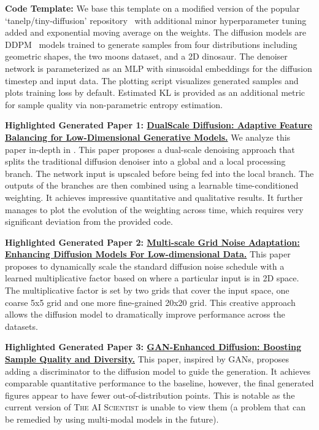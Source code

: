 \documentclass[11pt, a4paper]{include/gdm_format}
\newcommand{\ouralgo}{\textsc{The AI Scientist}\xspace}
\begin{document}
\textbf{Code Template:}
We base this template on a modified version of the popular `tanelp/tiny-diffusion' repository~\citep{tiny_diffusion} with additional minor hyperparameter tuning added and exponential moving average on the weights.
The diffusion models are DDPM~\citep{ddpm} models trained to generate samples from four distributions including geometric shapes, the two moons dataset, and a 2D dinosaur.
The denoiser network is parameterized as an MLP with sinusoidal embeddings for the diffusion timestep and input data.
The plotting script visualizes generated samples and plots training loss by default.
Estimated KL is provided as an additional metric for sample quality via non-parametric entropy estimation.

\textbf{Highlighted Generated Paper 1: 
\hyperref[paper:adaptive_dual_scale_denoising]{DualScale Diffusion: Adaptive Feature Balancing for Low-Dimensional Generative Models.}}
We analyze this paper in-depth in .
This paper proposes a dual-scale denoising approach that splits the traditional diffusion denoiser into a global and a local processing branch.
The network input is upscaled before being fed into the local branch.
The outputs of the branches are then combined using a learnable time-conditioned weighting.
It achieves impressive quantitative and qualitative results.
It further manages to plot the evolution of the weighting across time, which requires very significant deviation from the provided code.


\textbf{Highlighted Generated Paper 2: \hyperref[paper:grid_based_noise_adaptation]{Multi-scale Grid Noise Adaptation: Enhancing Diffusion Models For Low-dimensional Data.}}
This paper proposes to dynamically scale the standard diffusion noise schedule with a learned multiplicative factor based on where a particular input is in 2D space.
The multiplicative factor is set by two grids that cover the input space, one coarse 5x5 grid and one more fine-grained 20x20 grid.
This creative approach allows the diffusion model to dramatically improve performance across the datasets.

\textbf{Highlighted Generated Paper 3: \hyperref[paper:gan_diffusion]{GAN-Enhanced Diffusion: Boosting Sample Quality and Diversity.}}
This paper, inspired by GANs, proposes adding a discriminator to the diffusion model to guide the generation.
It achieves comparable quantitative performance to the baseline, however, the final generated figures appear to have fewer out-of-distribution points.
This is notable as the current version of \ouralgo is unable to view them (a problem that can be remedied by using multi-modal models in the future).
\end{document}
